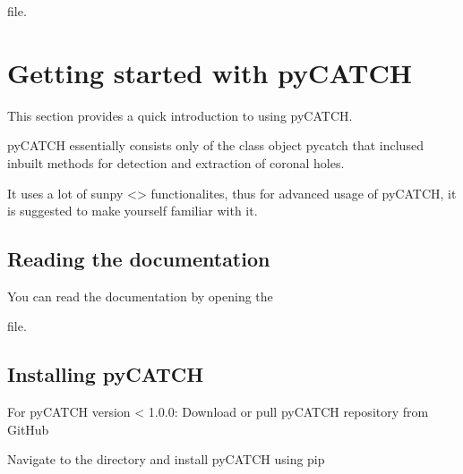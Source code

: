 \documentclass[letterpaper,10pt,english]{sphinxmanual}
\begin{document}
\sphinxAtStartPar
file.

\sphinxstepscope


\chapter{Getting started with pyCATCH}
\label{\detokenize{getting_started:getting-started-with-pycatch}}\label{\detokenize{getting_started::doc}}
\sphinxAtStartPar
This section provides a quick introduction to using pyCATCH.

\sphinxAtStartPar
pyCATCH essentially consists only of the class object pycatch that inclused inbuilt methods for detection and extraction of coronal holes.

\sphinxAtStartPar
It uses a lot of sunpy \textless{}\textgreater{} functionalites, thus for advanced usage of pyCATCH, it is suggested to make yourself familiar with it.


\section{Reading the documentation}
\label{\detokenize{getting_started:reading-the-documentation}}
\sphinxAtStartPar
You can read the documentation by opening the

\begin{sphinxVerbatim}[commandchars=\\\{\}]
\end{sphinxVerbatim}

\sphinxAtStartPar
file.


\section{Installing pyCATCH}
\label{\detokenize{getting_started:installing-pycatch}}
\sphinxAtStartPar
For pyCATCH version \textless{} 1.0.0:    Download or pull pyCATCH repository from GitHub

\begin{sphinxVerbatim}[commandchars=\\\{\}]
\end{sphinxVerbatim}

\sphinxAtStartPar
Navigate to the directory and install pyCATCH using pip
\end{document}
